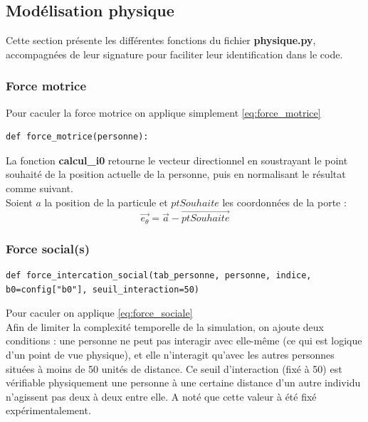 \documentclass[a4paper,12pt]{article}
\begin{document}
\subsection{Modélisation physique}
Cette section présente les différentes fonctions du fichier \textbf{physique.py}, accompagnées de leur signature pour faciliter leur identification dans le code.
\subsubsection{Force motrice}

Pour caculer la force motrice on applique simplement \eqref{eq:force_motrice}

\begin{verbatim}
def force_motrice(personne):
\end{verbatim}

La fonction \textbf{calcul\_i0} retourne le vecteur directionnel en soustrayant le point souhaité de la position actuelle de la personne, puis en normalisant le résultat comme suivant.
\\
\indent Soient $a$ la position de la particule et $ptSouhaite$ les coordonnées de la porte :
\begin{equation}
	\vec{e_\theta} = \vec{a} - \vec{ptSouhaite}
\end{equation}


\subsubsection{Force social(s)}


\begin{verbatim}
def force_intercation_social(tab_personne, personne, indice, b0=config["b0"], seuil_interaction=50)
\end{verbatim}

Pour caculer on applique \eqref{eq:force_sociale}
\\

Afin de limiter la complexité temporelle de la simulation, on ajoute deux conditions : une personne ne peut pas interagir avec elle-même (ce qui est logique d’un point de vue physique), et elle n’interagit qu’avec les autres personnes situées à moins de 50 unités de distance.  Ce seuil d’interaction (fixé à 50) est vérifiable physiquement une personne à une certaine distance d'un autre individu n'agissent pas deux à deux entre elle. A noté que cette valeur à été fixé expérimentalement.
\end{document}
